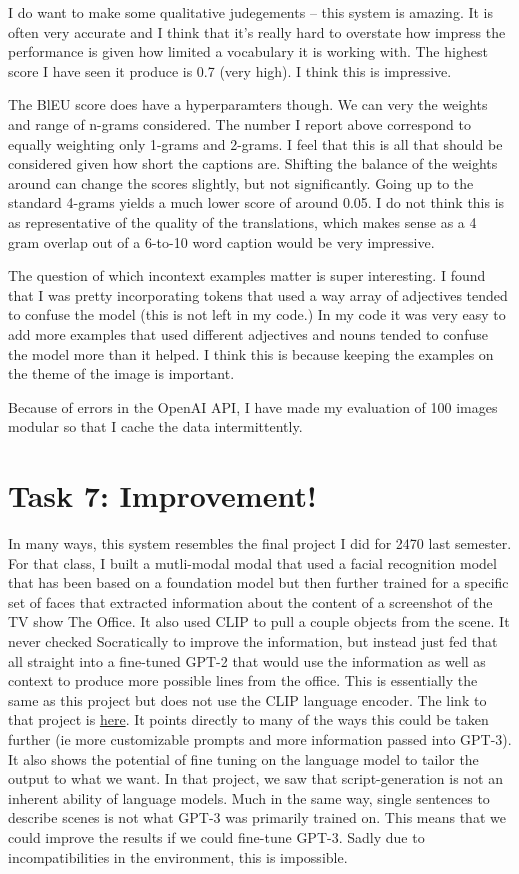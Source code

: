 \documentclass{article}
\begin{document}
I do want to make some qualitative judegements -- this system is amazing. It is often very accurate and I think that it's really hard to overstate how impress the performance is given how limited a vocabulary it is working with. The highest score I have seen it produce is 0.7 (very high). I think this is impressive. 

The BlEU score does have a hyperparamters though. We can very the weights and range of n-grams considered. The number I report above correspond to equally weighting only 1-grams and 2-grams. I feel that this is all that should be considered given how short the captions are. Shifting the balance of the weights around can change the scores slightly, but not significantly. Going up to the standard 4-grams yields a much lower score of around 0.05. I do not think this is as representative of the quality of the translations, which makes sense as a 4 gram overlap out of a 6-to-10 word caption would be very impressive.

The question of which incontext examples matter is super interesting. I found that I was pretty incorporating tokens that used a way array of adjectives tended to confuse the model (this is not left in my code.) In my code it was very easy to add more examples that used different adjectives and nouns tended to confuse the model more than it helped. I think this is because keeping the examples on the theme of the image is important.

Because of errors in the OpenAI API, I have made my evaluation of 100 images modular so that I cache the data intermittently. 

\section*{Task 7: Improvement!} In many ways, this system resembles the final project I did for 2470 last semester. For that class, I built a mutli-modal modal that used a facial recognition model that has been based on a foundation model but then further trained for a specific set of faces that extracted information about the content of a screenshot of the TV show The Office. It also used CLIP to pull a couple objects from the scene. It never checked Socratically to improve the information, but instead just fed that all straight into a fine-tuned GPT-2 that would use the information as well as context to produce more possible lines from the office. This is essentially the same as this project but does not use the CLIP language encoder. The link to that project is \href{https://github.com/usernamenoahfoster/Regional_Programmer}{here}. It points directly to many of the ways this could be taken further (ie more customizable prompts and more information passed into GPT-3). It also shows the potential of fine tuning on the language model to tailor the output to what we want. In that project, we saw that script-generation is not an inherent ability of language models. Much in the same way, single sentences to describe scenes is not what GPT-3 was primarily trained on. This means that we could improve the results if we could fine-tune GPT-3. Sadly due to incompatibilities in the environment, this is impossible. 
\end{document}
